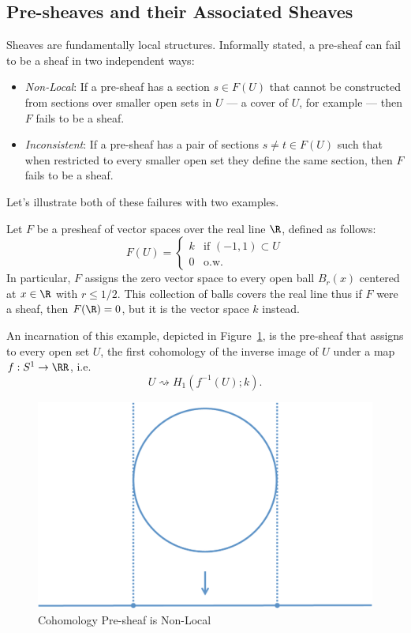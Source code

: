 \subsection{Pre-sheaves and their Associated Sheaves}\label{subsec:sheafification}

Sheaves are fundamentally local structures. Informally stated, a pre-sheaf can fail to be a sheaf in two independent ways:
\begin{itemize}
\item \emph{Non-Local}: If a pre-sheaf has a section $s\in F(U)$ that cannot be constructed from sections over smaller open sets in $U$ --- a cover of $U$, for example --- then $F$ fails to be a sheaf.
\item \emph{Inconsistent}: If a pre-sheaf has a pair of sections $s\neq t\in F(U)$ such that when restricted to every smaller open set they define the same section, then $F$ fails to be a sheaf.
\end{itemize}

Let's illustrate both of these failures with two examples.
\begin{ex}\label{ex:nonlocalpresheaf}
Let $F$ be a presheaf of vector spaces over the real line $\R$, defined as follows:
\begin{equation*}
 F(U)=
\begin{cases}
 k & \text{if } (-1,1)\subset U \\
0 & \text{o.w.}
\end{cases}
\end{equation*}
In particular, $F$ assigns the zero vector space to every open ball $B_r(x)$ centered at $x\in\R$ with $r\leq 1/2$. This collection of balls covers the real line thus if $F$ were a sheaf, then $F(\R)=0$, but it is the vector space $k$ instead.

An incarnation of this example, depicted in Figure~\ref{fig:nonlocal_presheaf}, is the pre-sheaf that assigns to every open set $U$, the first cohomology of the inverse image of $U$ under a map $f:S^1\to\RR$, i.e. 
\[
U\rightsquigarrow H_1(f^{-1}(U);k).
\] 
\begin{figure}[ht]
\centering
\includegraphics[width=.7\textwidth]{presheaf_1.pdf}
\caption{Cohomology Pre-sheaf is Non-Local}
\label{fig:nonlocal_presheaf}
\end{figure}

\end{ex}


